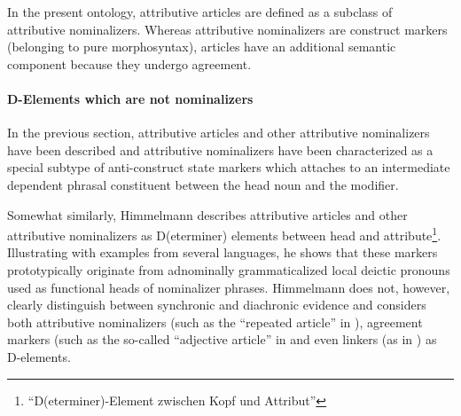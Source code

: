In the present ontology, attributive articles are defined as a subclass of attributive nominalizers. Whereas attributive nominalizers are construct markers (belonging to pure morphosyntax), articles have an additional semantic component because they undergo agreement. %

\paragraph{D-Elements which are not nominalizers}
In the previous section, attributive articles and other attributive nominalizers have been described and attributive nominalizers have been characterized as a special subtype of anti\hyp{}construct state markers which attaches to an intermediate dependent phrasal constituent between the head noun and the modifier.

Somewhat similarly, Himmelmann \citeyear{himmelmann1997} describes attributive articles and other attributive nominalizers as D(eterminer) elements between head and attribute\footnote{“D(eterminer)-Element zwischen Kopf und Attribut”}. Illustrating  with examples from several languages, he shows that these markers prototypically originate from adnominally grammaticalized local deictic pronouns used as functional heads of nominalizer phrases. Himmelmann does not, however, clearly distinguish between synchronic and diachronic evidence and considers both attributive nominalizers (such as the “repeated article” in ), agreement markers (such as the so-called “adjective article” in  and even linkers (as in ) as D-elements.

